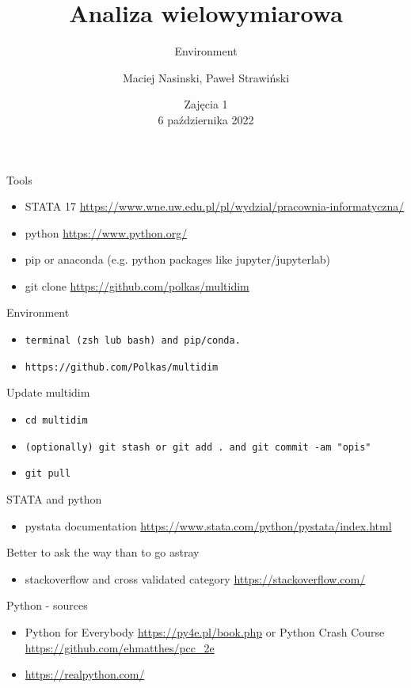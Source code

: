 \documentclass{beamer}
\begin{document}
\begin{frame}
\title[Tytuł]{Analiza wielowymiarowa}
\subtitle{Environment}
\author{Maciej Nasinski, Paweł Strawiński}
\date{Zajęcia 1 \\ 6 października 2022}
\titlepage
\end{frame}

\begin{frame}{Tools}
  \begin{itemize}
  \item STATA 17 \url{https://www.wne.uw.edu.pl/pl/wydzial/pracownia-informatyczna/}
  \item python \url{https://www.python.org/}
  \item pip or anaconda (e.g. python packages like jupyter/jupyterlab)
  \item git clone \url{https://github.com/polkas/multidim}
  \end{itemize}
\end{frame}

\begin{frame}{Environment}
  \begin{itemize}
    \item \texttt{terminal (zsh lub bash) and pip/conda.}
    \item \texttt{https://github.com/Polkas/multidim}
  \end{itemize}
\end{frame}

\begin{frame}{Update multidim}
  \begin{itemize}
    \item \texttt{cd multidim}
    \item \texttt{(optionally) git stash or git add . and git commit -am "opis"}
    \item \texttt{git pull}
  \end{itemize}
\end{frame}

\begin{frame}{STATA and python}
  \begin{itemize}
  \item pystata documentation \url{https://www.stata.com/python/pystata/index.html}
  \end{itemize}
\end{frame}

\begin{frame}{Better to ask the way than to go astray}
  \begin{itemize}
  \item stackoverflow and cross validated category \url{https://stackoverflow.com/}
  \end{itemize}
\end{frame}

\begin{frame}{Python - sources}
  \begin{itemize}
  \item Python for Everybody \url{https://py4e.pl/book.php} or Python Crash Course \url{https://github.com/ehmatthes/pcc_2e}
  \item \url{https://realpython.com/}
  \end{itemize}
\end{frame}
\end{document}
